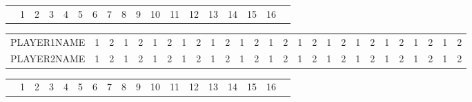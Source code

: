 \documentclass[22pt]{scrartcl}
\begin{document}
\renewcommand\arraystretch{1.25}
\renewcommand\tabcolsep{6pt}

\begin{table}

\begin{tabular}{p{5cm}|c|c|c|c|c|c!{\vrule width 2pt}c|c|c|c|c|c|c|c|c|c!{\vrule width 3pt}p{1cm}!{\vrule width 3pt}}
 & 1 & 2 & 3 & 4 & 5 & 6 & 7 & 8 & 9 & 10 & 11 & 12 & 13 & 14 & 15 & 16 & \\
\end{tabular}

\begin{tabular}{p{5cm}|c|c|c|c|c|c|c|c|c|c|c|c|c|c|c|c|c|c|c|c|c|c|c|c|c|c|}


\cline{2-27}
PLAYER1NAME & \footnotesize 1 & \footnotesize 2 & \footnotesize 1 & \footnotesize 2 & \footnotesize 1 & \footnotesize 2 & \footnotesize 1 & \footnotesize 2 & \footnotesize 1 & \footnotesize 2 & \footnotesize 1 & \footnotesize 2 & \footnotesize 1 & \footnotesize 2 & \footnotesize 1 & \footnotesize 2 & \footnotesize 1 & \footnotesize 2 & \footnotesize 1 & \footnotesize 2 & \footnotesize 1 & \footnotesize 2 & \footnotesize 1 & \footnotesize 2 & \footnotesize 1 & \footnotesize 2 \\
\cline{1-27} 

\cline{1-27}
PLAYER2NAME & \footnotesize 1 & \footnotesize 2 & \footnotesize 1 & \footnotesize 2 & \footnotesize 1 & \footnotesize 2 & \footnotesize 1 & \footnotesize 2 & \footnotesize 1 & \footnotesize 2 & \footnotesize 1 & \footnotesize 2 & \footnotesize 1 & \footnotesize 2 & \footnotesize 1 & \footnotesize 2 & \footnotesize 1 & \footnotesize 2 & \footnotesize 1 & \footnotesize 2 & \footnotesize 1 & \footnotesize 2 & \footnotesize 1 & \footnotesize 2 & \footnotesize 1 & \footnotesize 2 \\
\cline{2-27}

\end{tabular}

\begin{tabular}{p{5cm}|c|c|c|c|c|c!{\vrule width 2pt}c|c|c|c|c|c|c|c|c|c!{\vrule width 3pt}p{1cm}!{\vrule width 3pt}}

& 1 & 2 & 3 & 4 & 5 & 6 & 7 & 8 & 9 & 10 & 11 & 12 & 13 & 14 & 15 & 16 & \\
\end{tabular}

~\\


\end{table}
\end{document}
